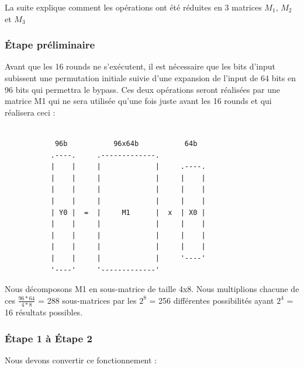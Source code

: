 \documentclass[a4paper,12pt]{article}
\begin{document}
La suite explique comment les opérations ont été réduites en 3 matrices $M_1$, $M_2$ et $M_3$

\subsubsection{Étape préliminaire}

Avant que les 16 rounds ne s'exécutent, il est nécessaire que les bits d'input subissent une permutation initiale suivie d'une expansion de l'input de 64 bits en 96 bits qui permettra le bypass.
Ces deux opérations seront réalisées par une matrice M1 qui ne sera utilisée qu'une fois juste avant les 16 rounds et qui réalisera ceci :

\begin{Verbatim}[samepage=true]

            96b           96x64b           64b
           .----.     .-------------. 
           |    |     |             |     .----.
           |    |     |             |     |    |
           |    |     |             |     |    |
           |    |     |             |     |    |
           | Y0 |  =  |     M1      |  x  | X0 |
           |    |     |             |     |    |
           |    |     |             |     |    |
           |    |     |             |     |    |
           |    |     |             |     '----'
           '----'     '-------------'

\end{Verbatim}


Nous décomposons M1 en sous-matrice de taille 4x8. Nous multiplions chacune de ces $\frac{96*64}{4*8}$ = 288 sous-matrices par les $2^8$ = 256 différentes possibilités ayant $2^4$ = 16 résultats possibles.


\subsubsection{Étape 1 à Étape 2}

Nous devons convertir ce fonctionnement :
\end{document}
